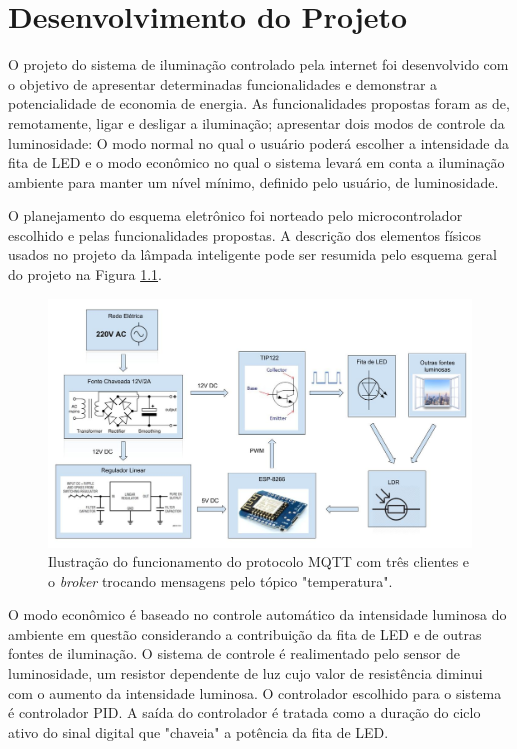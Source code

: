 \chapter{Desenvolvimento do Projeto}

O projeto do sistema de iluminação controlado pela internet foi desenvolvido com o objetivo de apresentar determinadas funcionalidades e demonstrar a potencialidade de economia de energia. As funcionalidades propostas foram as de, remotamente, ligar e desligar a iluminação; apresentar dois modos de controle da luminosidade: O modo normal no qual o usuário poderá escolher a intensidade da fita de LED e o modo econômico no qual o sistema levará em conta a iluminação ambiente para manter um nível mínimo, definido pelo usuário, de luminosidade. 

O planejamento do esquema eletrônico foi norteado pelo microcontrolador escolhido e pelas funcionalidades propostas. A descrição dos elementos físicos usados no projeto da lâmpada inteligente pode ser resumida pelo esquema geral do projeto na Figura \ref{esquema}.

\begin{figure}[ht]
    \begin{center}
    \includegraphics[width=\textwidth]{figuras/esquema_eletrico.jpg}
    \end{center}
    \caption[Esquema geral do projeto da fita de LED MQTT.]{Ilustração do funcionamento do protocolo MQTT com três clientes e o \textit{broker} trocando mensagens pelo tópico "temperatura".}
    \label{esquema}
\end{figure}

O modo econômico é baseado no controle automático da intensidade luminosa do ambiente em questão considerando a contribuição da fita de LED e de outras fontes de iluminação. O sistema de controle é realimentado pelo sensor de luminosidade, um resistor dependente de luz cujo valor de resistência diminui com o aumento da intensidade luminosa. O controlador escolhido para o sistema é controlador \acf{PID}. A saída do controlador é tratada como a duração do ciclo ativo do sinal digital que "chaveia" a potência da fita de LED.

